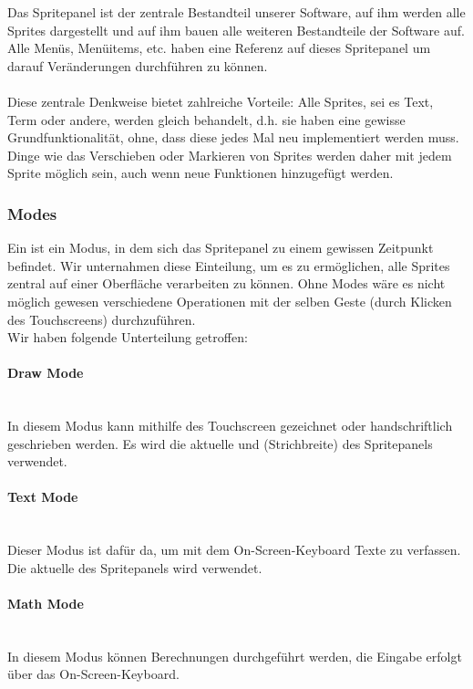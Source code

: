 Das Spritepanel ist der zentrale Bestandteil unserer Software, auf ihm werden alle Sprites dargestellt und auf ihm bauen alle weiteren Bestandteile der Software auf. Alle Menüs, Menüitems, etc. haben eine Referenz auf dieses Spritepanel um darauf Veränderungen durchführen zu können.\\
\\
Diese zentrale Denkweise bietet zahlreiche Vorteile: Alle Sprites, sei es Text, Term oder andere, werden gleich behandelt, d.h. sie haben eine gewisse Grundfunktionalität, ohne, dass diese jedes Mal neu implementiert werden muss. Dinge wie das Verschieben oder Markieren von Sprites werden daher mit jedem Sprite möglich sein, auch wenn neue Funktionen hinzugefügt werden.

\subsubsection{Modes}

Ein  ist ein Modus, in dem sich das Spritepanel zu einem gewissen Zeitpunkt befindet. Wir unternahmen diese Einteilung, um es zu ermöglichen, alle Sprites zentral auf einer Oberfläche verarbeiten zu können. Ohne Modes wäre es nicht möglich gewesen verschiedene Operationen mit der selben Geste (durch Klicken des Touchscreens) durchzuführen.\\
Wir haben folgende Unterteilung getroffen:

\setcounter{secnumdepth}{4}
\paragraph{Draw Mode}\ \\
In diesem Modus kann mithilfe des Touchscreen gezeichnet oder handschriftlich geschrieben werden. Es wird die aktuelle  und  (Strichbreite) des Spritepanels verwendet.
\paragraph{Text Mode}\ \\
Dieser Modus ist dafür da, um mit dem On-Screen-Keyboard Texte zu verfassen. Die aktuelle  des Spritepanels wird verwendet. 
\paragraph{Math Mode}\ \\
In diesem Modus können Berechnungen durchgeführt werden, die Eingabe erfolgt über das On-Screen-Keyboard. 
